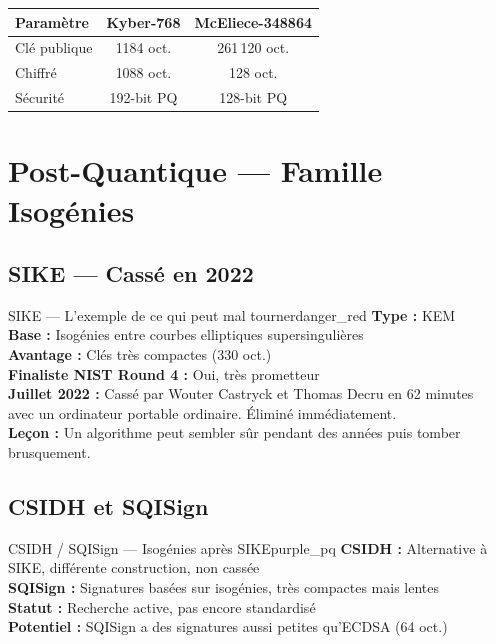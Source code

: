 \documentclass[12pt, a4paper]{article}
\begin{document}
\begin{center}
\renewcommand{\arraystretch}{1.4}
\begin{tabular}{lcc}
  \toprule
  \textbf{Paramètre} & \textbf{Kyber-768} & \textbf{McEliece-348864} \\
  \midrule
  Clé publique & 1184 oct. & 261\,120 oct. \\
  Chiffré & 1088 oct. & 128 oct. \\
  Sécurité & 192-bit PQ & 128-bit PQ \\
  \bottomrule
\end{tabular}
\end{center}

\section{Post-Quantique --- Famille Isogénies}

\subsection{SIKE --- Cassé en 2022}

\begin{algobox}{SIKE --- L'exemple de ce qui peut mal tourner}{danger_red}
\textbf{Type :} KEM\\
\textbf{Base :} Isogénies entre courbes elliptiques supersingulières\\
\textbf{Avantage :} Clés très compactes (330 oct.)\\
\textbf{Finaliste NIST Round 4 :} Oui, très prometteur\\
\textbf{Juillet 2022 :} Cassé par Wouter Castryck et Thomas Decru en 62 minutes\\
avec un ordinateur portable ordinaire. Éliminé immédiatement.\\
\textbf{Leçon :} Un algorithme peut sembler sûr pendant des années puis tomber brusquement.
\end{algobox}

\subsection{CSIDH et SQISign}

\begin{algobox}{CSIDH / SQISign --- Isogénies après SIKE}{purple_pq}
\textbf{CSIDH :} Alternative à SIKE, différente construction, non cassée\\
\textbf{SQISign :} Signatures basées sur isogénies, très compactes mais lentes\\
\textbf{Statut :} Recherche active, pas encore standardisé\\
\textbf{Potentiel :} SQISign a des signatures aussi petites qu'ECDSA (64 oct.)
\end{algobox}
\end{document}
